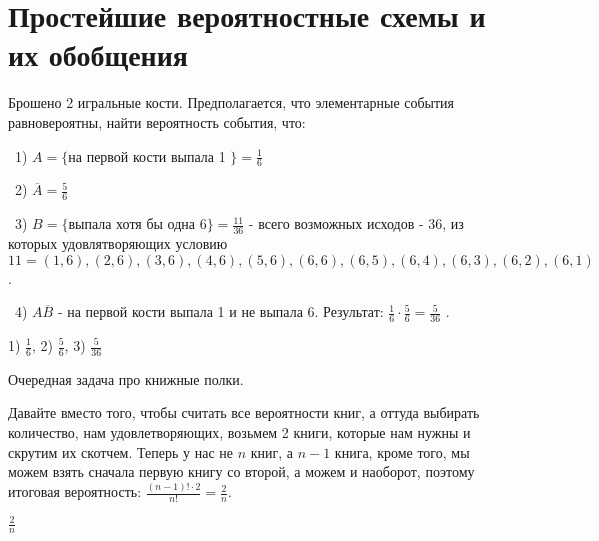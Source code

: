 \section{Простейшие вероятностные схемы и их обобщения}

\begin{task}{1}
Брошено 2 игральные кости. Предполагается, что элементарные события равновероятны,
найти вероятность события, что:
\end{task}

\begin{solution}
\par\smallskip
\noindent~1) $A = \{$на первой кости выпала 1 $\} = \frac{1}{6}$ 

\medskip
\noindent~2) $\overline{A} = \frac{5}{6}$ 

\medskip
\noindent~3) $B = \{$выпала хотя бы одна 6$\} = \frac{11}{36}$ - всего возможных исходов - $36$, из 
которых удовлятворяющих условию $11 = (1,6), (2,6), (3,6), (4,6), (5,6), (6,6), (6,5), (6,4),
(6,3), (6,2), (6,1)$.

\medskip
\noindent~4) $A \overline{B}$ - на первой кости выпала 1 и не выпала 6. Результат: $\frac{1}{6} \cdot  
\frac{5}{6} = \frac{5}{36}$ . 
\end{solution}

\begin{result}
1) $\frac{1}{6}$, 2) $\frac{5}{6}$, 3) $\frac{5}{36}$
\end{result}


\medskip
\begin{task}{2}
Очередная задача про книжные полки.
\end{task}

\begin{solution}
Давайте вместо того, чтобы считать все вероятности книг, а оттуда выбирать количество, 
нам удовлетворяющих, возьмем 2 книги, которые нам нужны и скрутим их скотчем. Теперь у нас не 
$n$ книг, а $n - 1$ книга, кроме того, мы можем взять сначала первую книгу со второй, а можем 
и наоборот, поэтому итоговая вероятность: $\frac{(n-1)! \cdot 2}{n!} = \frac{2}{n}$.
\end{solution}

\begin{result}
$\frac{2}{n}$
\end{result}


